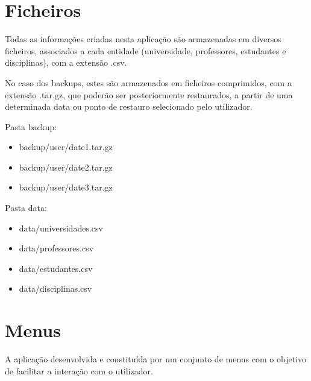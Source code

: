 \documentclass{article}
\begin{document}
\section{Ficheiros}
\label{sec:org338e199}

Todas as informações criadas nesta aplicação são armazenadas em diversos ficheiros, associados a cada entidade (universidade, professores, estudantes e disciplinas), com a extensão .csv.

No caso dos backups, estes são armazenados em ficheiros comprimidos, com a extensão .tar.gz, que poderão ser posteriormente restaurados, a partir de uma determinada data ou ponto de restauro selecionado pelo utilizador.

\vspace{1cm}

Pasta backup:

\begin{itemize}
\item backup/user/date1.tar.gz
\item backup/user/date2.tar.gz
\item backup/user/date3.tar.gz
\end{itemize}

\vspace{1cm}

Pasta data:

\begin{itemize}
\item data/universidades.csv
\item data/professores.csv
\item data/estudantes.csv
\item data/disciplinas.csv
\end{itemize}

\pagebreak{}
\section{Menus}
\label{sec:org7cc711f}

A aplicação desenvolvida e constituída por um conjunto de menus com o objetivo de facilitar a interação com o utilizador.

\vspace{2cm}
\end{document}
